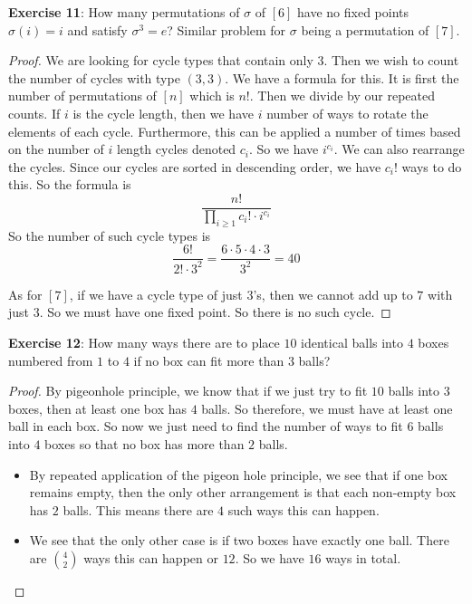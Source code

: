 \documentclass{article}
\begin{document}
\textbf{Exercise 11}: How many permutations of $\sigma$ of $[6]$ have no fixed points $\sigma(i) = i$ and satisfy $\sigma^{3} = e$? Similar problem for $\sigma$ being a permutation of $[7]$.
    \begin{proof}
        We are looking for cycle types that contain only $3$. Then we wish to count the number of cycles with type $(3, 3)$. We have a formula for this. It is first the number of permutations of $[n]$ which is $n!$. Then we divide by our repeated counts. If $i$ is the cycle length, then we have $i$ number of ways to rotate the elements of each cycle. Furthermore, this can be applied a number of times based on the number of $i$ length cycles denoted $c_{i}$. So we have $i^{c_{i}}$. We can also rearrange the cycles. Since our cycles are sorted in descending order, we have $c_{i}!$ ways to do this. So the formula is
            \begin{equation*}
                \dfrac{n!}{\prod_{i \geq 1}^{} c_{i}! \cdot i^{c_{i}}}
            \end{equation*}
        So the number of such cycle types is 
            \begin{equation*}
                \dfrac{6!}{2! \cdot 3^{2}} = \dfrac{6 \cdot 5 \cdot 4 \cdot 3}{3^{2}} = 40
            \end{equation*}

        As for $[7]$, if we have a cycle type of just $3$'s, then we cannot add up to $7$ with just $3$. So we must have one fixed point. So there is no such cycle.
    \end{proof}

\textbf{Exercise 12}: How many ways there are to place $10$ identical balls into $4$ boxes numbered from $1$ to $4$ if no box can fit more than $3$ balls?
    \begin{proof}
        By pigeonhole principle, we know that if we just try to fit $10$ balls into $3$ boxes, then at least one box has $4$ balls. So therefore, we must have at least one ball in each box. So now we just need to find the number of ways to fit $6$ balls into $4$ boxes so that no box has more than $2$ balls.
        \begin{itemize}
            \item By repeated application of the pigeon hole principle, we see that if one box remains empty, then the only other arrangement is that each non-empty box has $2$ balls. This means there are $4$ such ways this can happen.

            \item We see that the only other case is if two boxes have exactly one ball. There are $\binom{4}{2}$ ways this can happen or $12$. So we have $16$ ways in total.
        \end{itemize}
    \end{proof}
\end{document}
